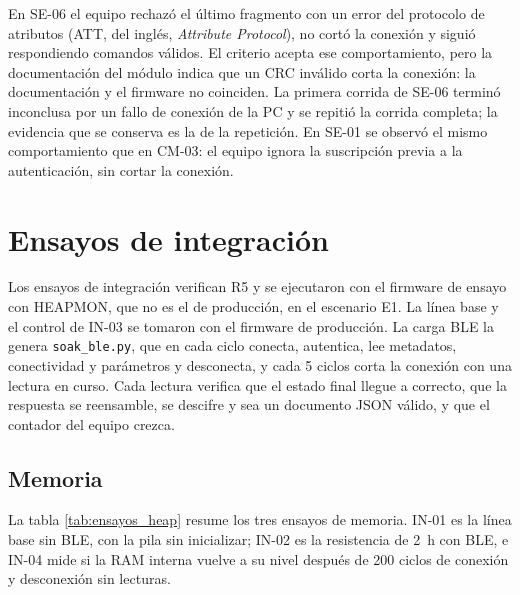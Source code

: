 En SE-06 el equipo rechazó el último fragmento con un error del protocolo de atributos (ATT, del inglés, \textit{Attribute Protocol}), no cortó la conexión y siguió respondiendo comandos válidos. El criterio acepta ese comportamiento, pero la documentación del módulo indica que un CRC inválido corta la conexión: la documentación y el firmware no coinciden. La primera corrida de SE-06 terminó inconclusa por un fallo de conexión de la PC y se repitió la corrida completa; la evidencia que se conserva es la de la repetición. En SE-01 se observó el mismo comportamiento que en CM-03: el equipo ignora la suscripción previa a la autenticación, sin cortar la conexión.


\section{Ensayos de integración}
\label{sec:ensayos_integracion}

Los ensayos de integración verifican R5 y se ejecutaron con el firmware de ensayo con HEAPMON, que no es el de producción, en el escenario E1. La línea base y el control de IN-03 se tomaron con el firmware de producción. La carga BLE la genera \texttt{soak\_ble.py}, que en cada ciclo conecta, autentica, lee metadatos, conectividad y parámetros y desconecta, y cada 5 ciclos corta la conexión con una lectura en curso. Cada lectura verifica que el estado final llegue a correcto, que la respuesta se reensamble, se descifre y sea un documento JSON válido, y que el contador del equipo crezca.

\subsection{Memoria}
\label{subsec:ensayos_memoria}

La tabla \ref{tab:ensayos_heap} resume los tres ensayos de memoria. IN-01 es la línea base sin BLE, con la pila sin inicializar; IN-02 es la resistencia de 2~h con BLE, e IN-04 mide si la RAM interna vuelve a su nivel después de 200 ciclos de conexión y desconexión sin lecturas.


